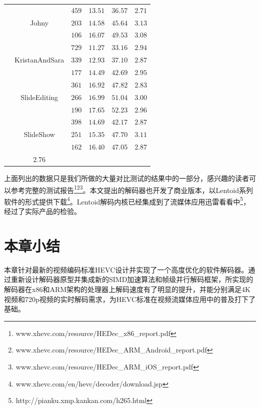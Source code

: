 \begin{table}[!ht]
\begin{center}
\begin{tabular}{c|c|c|c|c|c}
			& \multirow{3}{*}{Johny} &
			$459$ & $13.51$ & $36.57$ & $2.71$ \\
			\cline{3-6}
			& & $203$ & $14.58$ & $45.64$ & $3.13$ \\
			\cline{3-6}
			& & $106$ & $16.07$ & $49.53$ & $3.08$ \\
			\cline{2-6}
			& \multirow{3}{*}{KristanAndSara} &
			$729$ & $11.27$ & $33.16$ & $2.94$ \\
			\cline{3-6}
			& & $339$ & $12.93$ & $37.10$ & $2.87$ \\
			\cline{3-6}
			& & $177$ & $14.49$ & $42.69$ & $2.95$ \\
			\cline{2-6}
			& \multirow{3}{*}{SlideEditing} &
			$361$ & $16.92$ & $47.82$ & $2.83$ \\
			\cline{3-6}
			& & $266$ & $16.99$ & $51.04$ & $3.00$ \\
			\cline{3-6}
			& & $190$ & $17.65$ & $52.23$ & $2.96$ \\
			\cline{2-6}
			& \multirow{3}{*}{SlideShow} &
			$398$ & $14.69$ & $42.17$ & $2.87$ \\
			\cline{3-6}
			& & $251$ & $15.35$ & $47.70$ & $3.11$ \\
			\cline{3-6}
			& & $162$ & $16.40$ & $47.05$ & $2.87$ \\
			\hline
			\rowcolor[gray]{.9}
			\multicolumn{5}{>{\columncolor[gray]{.9}}c|}{平均加速比} & $2.76$ \\
			\hline
		\end{tabular}
	\end{center}
\end{table}

上面列出的数据只是我们所做的大量对比测试的结果中的一部分，感兴趣的读者可以参考完整的测试报告\footnote{www.xhevc.com/resource/HEDec\_x86\_report.pdf}\footnote{www.xhevc.com/resource/HEDec\_ARM\_Android\_report.pdf}\footnote{www.xhevc.com/resource/HEDec\_ARM\_iOS\_report.pdf}。本文提出的解码器也开发了商业版本，以Lentoid系列软件的形式提供下载\footnote{www.xhevc.com/en/hevc/decoder/download.jsp}。Lentoid解码内核已经集成到了流媒体应用迅雷看看中\footnote{http://pianku.xmp.kankan.com/h265.html}，经过了实际产品的检验。

\section{本章小结}

本章针对最新的视频编码标准HEVC设计并实现了一个高度优化的软件解码器。通过重新设计解码器原型并集成新的SIMD加速算法和帧级并行解码框架，所实现的解码器在x86和ARM架构的处理器上解码速度有了明显的提升，并能分别满足4K视频和720p视频的实时解码需求，为HEVC标准在视频流媒体应用中的普及打下了基础。
